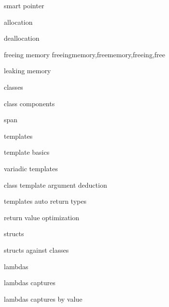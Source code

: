          smart pointer
        
         allocation 
        
         deallocation 
        
         freeing memory 
        freeingmemory,freememory,freeing,free 
        
         leaking memory 
        
         classes 
        
         class components 
        
         span 
        
         templates
        
         template basics 
        
         variadic templates
        
         class template argument deduction 
        
         templates auto return types 
        
         return value optimization 
        
         structs 
        
         structs against classes 
        
         lambdas
        
         lambdas captures
        
         lambdas captures by value
        
